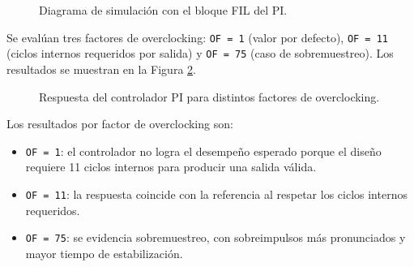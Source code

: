 \begin{figure}[H]
  \centering
  \caption{Diagrama de simulación con el bloque FIL del PI.}
  \label{fig:pi_fil_diagram}
\end{figure}

Se evalúan tres factores de overclocking: \texttt{OF = 1} (valor por defecto), \texttt{OF = 11} (ciclos internos requeridos por salida) y \texttt{OF = 75} (caso de sobremuestreo). Los resultados se muestran en la Figura \ref{fig:pi_fil_scopes}.

\begin{figure}[H]
  \centering
  \begin{minipage}[t]{0.32\textwidth}
    \centering
    \caption*{OF = 1}
  \end{minipage}
  \begin{minipage}[t]{0.32\textwidth}
    \centering
    \caption*{OF = 11}
  \end{minipage}
  \begin{minipage}[t]{0.32\textwidth}
    \centering
    \caption*{OF = 75}
  \end{minipage}
  \caption{Respuesta del controlador PI para distintos factores de overclocking.}
  \label{fig:pi_fil_scopes}
\end{figure}

Los resultados por factor de overclocking son:
\begin{itemize}
  \item \texttt{OF = 1}: el controlador no logra el desempeño esperado porque el diseño requiere 11 ciclos internos para producir una salida válida.
  \item \texttt{OF = 11}: la respuesta coincide con la referencia al respetar los ciclos internos requeridos.
  \item \texttt{OF = 75}: se evidencia sobremuestreo, con sobreimpulsos más pronunciados y mayor tiempo de estabilización.
\end{itemize}
